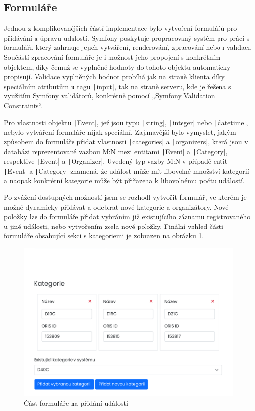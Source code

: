 \subsection{Formuláře}
Jednou z komplikovanějších částí implementace bylo vytvoření formulářů pro přidávání a úpravu událostí. Symfony poskytuje propracovaný systém pro práci s formuláři, který zahrnuje jejich vytváření, renderování, zpracování nebo i validaci. Součástí zpracování formuláře je i možnost jeho propojení s konkrétním objektem, díky čemuž se vyplněné hodnoty do tohoto objektu automaticky propisují. Validace vyplněných hodnot probíhá jak na straně klienta díky speciálním atributům u tagu \texttt|input|, tak na straně serveru, kde je řešena s využitím Symfony validátorů, konkrétně pomocí „Symfony Validation Constraints“.

Pro vlastnosti objektu \texttt|Event|, jež jsou typu \texttt|string|, \texttt|integer| nebo \texttt|datetime|, nebylo vytváření formuláře nijak speciální. Zajímavější bylo vymyslet, jakým způsobem do formuláře přidat vlastnosti \texttt|categories| a \texttt|organizers|, která jsou v databázi reprezentované vazbou M:N mezi entitami \texttt|Event| a \texttt|Category|, respektive \texttt|Event| a \texttt|Organizer|. Uvedený typ vazby M:N v případě entit \texttt|Event| a \texttt|Category| znamená, že událost může mít libovolné množství kategorií a naopak konkrétní kategorie může být přiřazena k libovolnému počtu událostí.

Po zvážení dostupných možností jsem se rozhodl vytvořit formulář, ve kterém je možné dynamicky přidávat a odebírat nové kategorie a organizátory. Nové položky lze do formuláře přidat vybráním již existujícího záznamu registrovaného u jiné události, nebo vytvořením zcela nové položky. Finální vzhled části formuláře obsahující sekci s kategoriemi je zobrazen na obrázku \ref{figure:form}.

\begin{figure}[h]
    \caption{Část formuláře na přidání události}
    \label{figure:form}
    \centering
    \includegraphics[width=0.947\linewidth, cfbox=kuorisgray 0.5pt 10pt]{images/form.pdf}
\end{figure}

